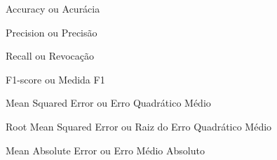 \begin{siglas}
    \item[ACC]{Accuracy ou Acurácia}
    \item[PRE]{Precision ou Precisão}
    \item[REC]{Recall ou Revocação}
    \item[F1]{F1-score ou Medida F1}
    \item[MSE]{Mean Squared Error ou Erro Quadrático Médio}
    \item[RMSE]{Root Mean Squared Error ou Raiz do Erro Quadrático Médio}
    \item[MAE]{Mean Absolute Error ou Erro Médio Absoluto}
\end{siglas}
